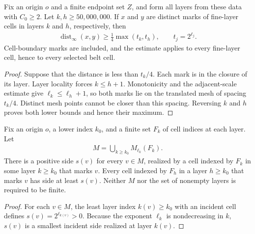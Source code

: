 \begin{lemma}
    \label{thm:area_law_fine_layer_mark_separation}
    \leanok
    Fix an origin $o$ and a finite endpoint set $Z$, and form all layers
    from these data with $C_0\ge2$. Let $k,h\ge50{,}000{,}000$. If $x$ and $y$ are
    distinct marks of fine-layer cells in layers $k$ and $h$,
    respectively, then
    \begin{align}
        \operatorname{dist}_\infty(x,y)\ge\frac14\max(t_k,t_h),
        \qquad t_j=2^{\ell_j}.
    \end{align}
    Cell-boundary marks are included, and the estimate applies to every
    fine-layer cell, hence to every selected belt cell.
\end{lemma}
\begin{proof}\leanok
    Suppose that the distance is less than $t_k/4$. Each mark is in the
    closure of its layer. Layer locality forces $k\le h+1$.
    Monotonicity and the adjacent-scale estimate give
    $\ell_k\le\ell_h+1$, so both marks lie on the translated mesh of
    spacing $t_k/4$. Distinct mesh points cannot be closer than this
    spacing. Reversing $k$ and $h$ proves both lower bounds and hence
    their maximum.
\end{proof}

\begin{lemma}
    \label{thm:area_law_least_incident_mark_scales}
    \leanok
    Fix an origin $o$, a lower index $k_0$, and a finite set $F_k$ of
    cell indices at each layer. Let
    \begin{align}
        M=\bigcup_{k\ge k_0}M_{\ell_k}(F_k).
    \end{align}
    There is a positive side $s(v)$ for every $v\in M$, realized by a
    cell indexed by $F_k$ in some layer $k\ge k_0$ that marks $v$.
    Every cell indexed by $F_h$ in a layer $h\ge k_0$ that marks $v$
    has side at least $s(v)$. Neither $M$ nor the set of nonempty layers
    is required to be finite.
\end{lemma}
\begin{proof}\leanok
    For each $v\in M$, the least layer index $k(v)\ge k_0$
    with an incident cell defines $s(v)=2^{\ell_{k(v)}}>0$.
    Because the exponent $\ell_k$ is nondecreasing in $k$, $s(v)$ is a
    smallest incident side realized at layer $k(v)$.
\end{proof}

